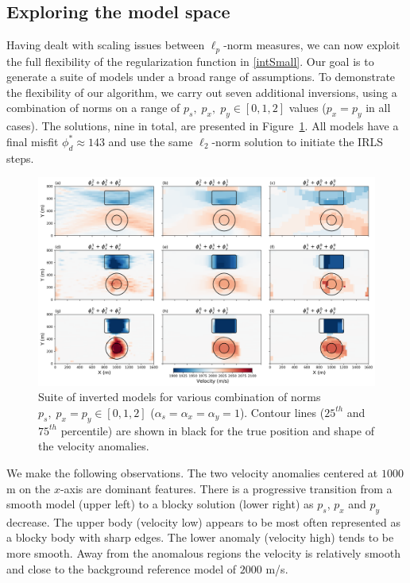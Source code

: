 \documentclass[extra,referee]{gji}
\begin{document}
\subsection{Exploring the model space}
Having dealt with scaling issues between $\ell_p$-norm measures, we can now exploit the full flexibility of the regularization function in \eqref{intSmall}.
Our goal is to generate a suite of models under a broad range of assumptions.
To demonstrate the flexibility of our algorithm, we carry out seven additional inversions, using a combination of norms on a range of $p_s,\; p_{x},\;p_y \in {[0,1,2]}$ values ($p_x=p_y$ in all cases). The solutions, nine in total,  are presented in Figure~\ref{Mixed2DSolutions}. All models have a final misfit $\phi_d^* \approx 143$ and use the same $\ell_2$-norm solution to initiate the IRLS steps.
\begin{figure}
\includegraphics[width=\columnwidth]{Figures/Problem2D_Tomo2D_9x9_Results.png}
\caption{Suite of inverted models for various combination of norms $p_s,\; p_{x}=p_{y} \in {[0,1,2]}$ ($\alpha_s=\alpha_x=\alpha_y=1$). Contour lines ($25^{th}$ and $75^{th}$ percentile) are shown in black for the true position and shape of the velocity anomalies.}
\label{Mixed2DSolutions}
\end{figure}
We make the following observations. The two velocity anomalies centered at $1000$ m on the $x$-axis are dominant features. There is a progressive transition from a smooth model (upper left) to a blocky solution (lower right) as $p_s$, $p_{x}$ and $p_y$ decrease. The upper body (velocity low) appears to be most often represented as a blocky body with sharp edges. The lower anomaly (velocity high) tends to be more smooth. Away from the anomalous regions the velocity is relatively smooth and close to the background reference model of $2000$ m/s.
\end{document}
